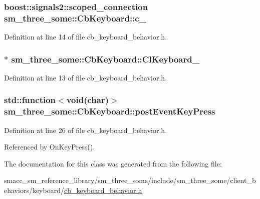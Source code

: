 \subsubsection[{\texorpdfstring{c\+\_\+}{c_}}]{\setlength{\rightskip}{0pt plus 5cm}boost\+::signals2\+::scoped\+\_\+connection sm\+\_\+three\+\_\+some\+::\+Cb\+Keyboard\+::c\+\_\+}\hypertarget{classsm__three__some_1_1CbKeyboard_a6b6a885c39f32f29e907cfbc37b08b6f}{}\label{classsm__three__some_1_1CbKeyboard_a6b6a885c39f32f29e907cfbc37b08b6f}


Definition at line 14 of file cb\+\_\+keyboard\+\_\+behavior.\+h.

\subsubsection[{\texorpdfstring{Cl\+Keyboard\+\_\+}{ClKeyboard_}}]{$\ast$ sm\+\_\+three\+\_\+some\+::\+Cb\+Keyboard\+::\+Cl\+Keyboard\+\_\+}\hypertarget{classsm__three__some_1_1CbKeyboard_adbbfdbe9e4dc267a55e85f19683131fc}{}\label{classsm__three__some_1_1CbKeyboard_adbbfdbe9e4dc267a55e85f19683131fc}


Definition at line 13 of file cb\+\_\+keyboard\+\_\+behavior.\+h.

\subsubsection[{\texorpdfstring{post\+Event\+Key\+Press}{postEventKeyPress}}]{\setlength{\rightskip}{0pt plus 5cm}std\+::function$<$void(char)$>$ sm\+\_\+three\+\_\+some\+::\+Cb\+Keyboard\+::post\+Event\+Key\+Press}\hypertarget{classsm__three__some_1_1CbKeyboard_a746c413234e920c55625d63f4a6be784}{}\label{classsm__three__some_1_1CbKeyboard_a746c413234e920c55625d63f4a6be784}


Definition at line 26 of file cb\+\_\+keyboard\+\_\+behavior.\+h.



Referenced by On\+Key\+Press().



The documentation for this class was generated from the following file\+:\begin{DoxyCompactItemize}
\item 
smacc\+\_\+sm\+\_\+reference\+\_\+library/sm\+\_\+three\+\_\+some/include/sm\+\_\+three\+\_\+some/client\+\_\+behaviors/keyboard/\hyperlink{cb__keyboard__behavior_8h}{cb\+\_\+keyboard\+\_\+behavior.\+h}\end{DoxyCompactItemize}
